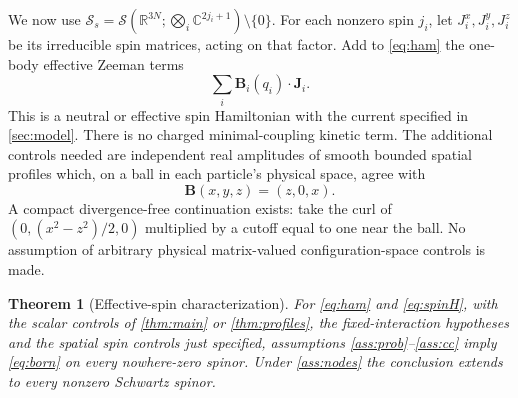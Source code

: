 \documentclass[11pt]{article}
\numberwithin{equation}{section}
\newtheorem{theorem}{Theorem}[section]
\theoremstyle{definition}
\newcommand{\R}{\mathbb R}
\newcommand{\C}{\mathbb C}
\newcommand{\Sch}{\mathcal S}
\begin{document}
We now use
\(\mathscr S_s=\Sch(\R^{3N};\bigotimes_i\C^{2j_i+1})\setminus\{0\}\).
For each nonzero spin \(j_i\), let \(J_i^x,J_i^y,J_i^z\) be its irreducible spin matrices, acting on that factor. Add to \eqref{eq:ham} the one-body effective Zeeman terms
\begin{equation}\label{eq:spinH}
 \sum_i \mathbf B_i(q_i)\cdot\mathbf J_i .
\end{equation}
This is a neutral or effective spin Hamiltonian with the current specified in \cref{sec:model}. There is no charged minimal-coupling kinetic term. The additional controls needed are independent real amplitudes of smooth bounded spatial profiles which, on a ball in each particle's physical space, agree with
\begin{equation}\label{eq:spinprofile}
 \mathbf B(x,y,z)=(z,0,x).
\end{equation}
A compact divergence-free continuation exists: take the curl of
\((0,(x^2-z^2)/2,0)\) multiplied by a cutoff equal to one near the ball. No assumption of arbitrary physical matrix-valued configuration-space controls is made.

\begin{theorem}[Effective-spin characterization]\label{thm:spin}
For \eqref{eq:ham} and \eqref{eq:spinH}, with the scalar controls of \cref{thm:main} or \cref{thm:profiles}, the fixed-interaction hypotheses and the spatial spin controls just specified, assumptions \ref{ass:prob}--\ref{ass:cc} imply \eqref{eq:born} on every nowhere-zero spinor. Under \ref{ass:nodes} the conclusion extends to every nonzero Schwartz spinor.
\end{theorem}
\end{document}
